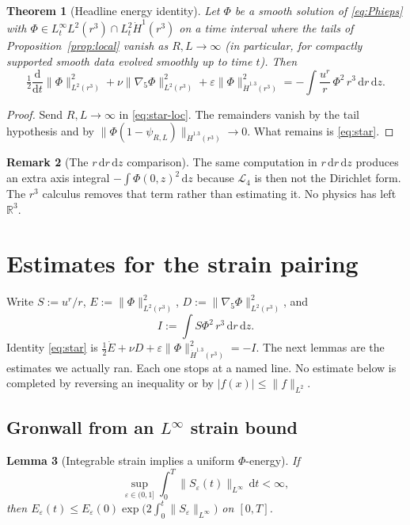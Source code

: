 \documentclass[11pt]{article}
\newtheorem{theorem}{Theorem}[section]
\newtheorem{lemma}[theorem]{Lemma}
\theoremstyle{definition}
\newtheorem{remark}[theorem]{Remark}
\newcommand{\eps}{\varepsilon}
\newcommand{\R}{\mathbb{R}}
\newcommand{\dd}{\mathrm{d}}
\newcommand{\ddt}{\frac{\mathrm{d}}{\mathrm{d}t}}
\newcommand{\ur}{u^{r}}
\newcommand{\Ph}{\Phi}
\newcommand{\Lfour}{\mathcal{L}_{4}}
\newcommand{\gradfive}{\nabla_{5}}
\newcommand{\Hdot}{\dot{H}}
\newcommand{\Lint}{L^{\infty}}
\newcommand{\norm}[2]{\|#1\|_{#2}}
\newcommand{\abs}[1]{\lvert#1\rvert}
\begin{document}
\begin{theorem}[Headline energy identity]
\label{thm:star}
Let \(\Ph\) be a smooth solution of \eqref{eq:Phieps} with
\(\Ph\in L^\infty_t L^2(r^3)\cap L^2_t\Hdot^1(r^3)\) on a time interval
where the tails of Proposition~\ref{prop:local} vanish as
\(R,L\to\infty\) (in particular, for compactly supported smooth data
evolved smoothly up to time \(t\)). Then
\begin{equation}
  \label{eq:star}
  \tfrac12\ddt\norm{\Ph}{L^2(r^3)}^2
  +\nu\norm{\gradfive\Ph}{L^2(r^3)}^2
  +\eps\norm{\Ph}{\Hdot^{1.3}(r^3)}^2
  =-\int\frac{\ur}{r}\,\Ph^2\,r^3\,\dd r\,\dd z.
\end{equation}
\end{theorem}

\begin{proof}
Send \(R,L\to\infty\) in \eqref{eq:star-loc}.
The remainders vanish by the tail hypothesis and by
\(\norm{\Ph(1-\psi_{R,L})}{\Hdot^{1.3}(r^3)}\to 0\).
What remains is \eqref{eq:star}.
\end{proof}

\begin{remark}[The \(r\,\dd r\,\dd z\) comparison]
The same computation in \(r\,\dd r\,\dd z\) produces an extra axis
integral \(-\int\Ph(0,z)^2\,\dd z\) because \(\Lfour\) is then not the
Dirichlet form. The \(r^3\) calculus removes that term rather than
estimating it. No physics has left \(\R^3\).
\end{remark}

\section{Estimates for the strain pairing}
\label{sec:strain}

Write \(S:=\ur/r\), \(E:=\norm{\Ph}{L^2(r^3)}^2\),
\(D:=\norm{\gradfive\Ph}{L^2(r^3)}^2\), and
\[
  I:=\int S\Ph^2\,r^3\,\dd r\,\dd z.
\]
Identity \eqref{eq:star} is
\(\tfrac12\dot E+\nu D+\eps\norm{\Ph}{\Hdot^{1.3}(r^3)}^2=-I\).
The next lemmas are the estimates we actually ran. Each one stops at
a named line. No estimate below is completed by reversing an inequality
or by \(\abs{f(x)}\le\norm{f}{L^2}\).

\subsection{Gronwall from an \(L^\infty\) strain bound}

\begin{lemma}[Integrable strain implies a uniform \(\Ph\)-energy]
\label{lem:gronwall}
If
\begin{equation}
  \label{eq:B1}
  \sup_{\eps\in(0,1]}
  \int_0^T\norm{S_\eps(t)}{\Lint}\,\dd t<\infty,
\end{equation}
then
\(E_\eps(t)\le E_\eps(0)\exp\bigl(2\int_0^t\norm{S_\eps}{\Lint}\bigr)\)
on \([0,T]\).
\end{lemma}
\end{document}
